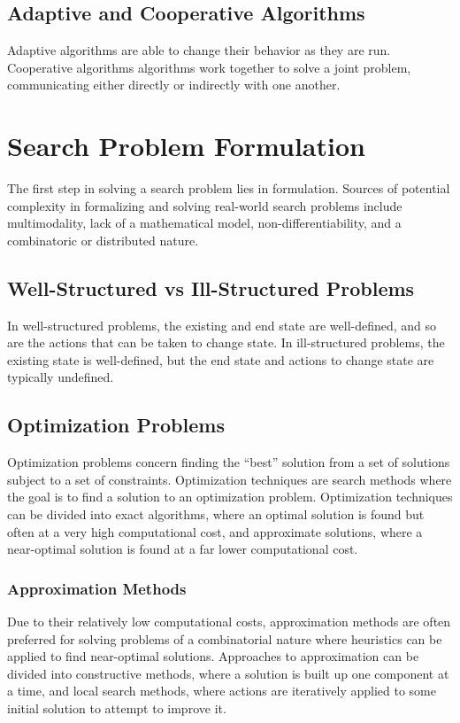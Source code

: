 \documentclass[12pt,titlepage]{article}
\begin{document}
    \subsection{Adaptive and Cooperative Algorithms}
      Adaptive algorithms are able to change their behavior as they are run. Cooperative algorithms algorithms work
      together to solve a joint problem, communicating either directly or indirectly with one another.

  \section{Search Problem Formulation}
    The first step in solving a search problem lies in formulation. Sources of potential complexity in formalizing and
    solving real-world search problems include multimodality, lack of a mathematical model, non-differentiability, and
    a combinatoric or distributed nature.

    \subsection{Well-Structured vs Ill-Structured Problems}
      In well-structured problems, the existing and end state are well-defined, and so are the actions that can be taken
      to change state. In ill-structured problems, the existing state is well-defined, but the end state and actions to
      change state are typically undefined.

    \subsection{Optimization Problems}
      Optimization problems concern finding the ``best'' solution from a set of solutions subject to a set of constraints.
      Optimization techniques are search methods where the goal is to find a solution to an optimization problem. Optimization
      techniques can be divided into exact algorithms, where an optimal solution is found but often at a very high computational
      cost, and approximate solutions, where a near-optimal solution is found at a far lower computational cost.

      \subsubsection{Approximation Methods}
        Due to their relatively low computational costs, approximation methods are often preferred for solving problems of a
        combinatorial nature where heuristics can be applied to find near-optimal solutions. Approaches to approximation can
        be divided into constructive methods, where a solution is built up one component at a time, and local search methods,
        where actions are iteratively applied to some initial solution to attempt to improve it.
\end{document}
